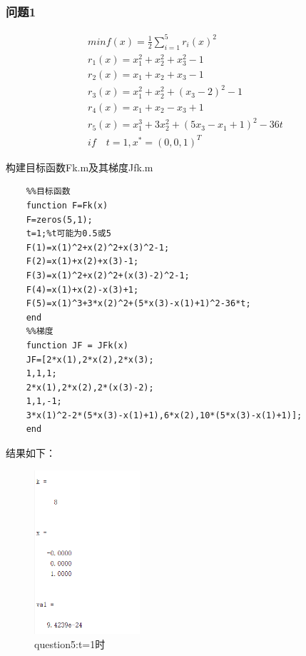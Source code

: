\documentclass[12pt]{article} %
\begin{document}
	\subsubsection{问题1}
	\begin{gather*}
	minf(x)=\frac{1}{2}\sum_{i=1}^{5} r_i(x)^2\\
	r_1(x)=x_1^2+x_2^2+x_3^2-1\\
	r_2(x)=x_1+x_2+x_3-1\\
	r_3(x)=x_1^2+x_2^2+(x_3-2)^2-1\\
	r_4(x)=x_1+x_2-x_3+1\\
	r_5(x)=x_1^3+3x_2^2+(5x_3-x_1+1)^2-36t\\
	if\quad t=1,x^*=(0,0,1)^T
	\end{gather*}
	
	构建目标函数Fk.m及其梯度Jfk.m
	\begin{lstlisting}
	%%目标函数
	function F=Fk(x)
	F=zeros(5,1);
	t=1;%t可能为0.5或5
	F(1)=x(1)^2+x(2)^2+x(3)^2-1;
	F(2)=x(1)+x(2)+x(3)-1;
	F(3)=x(1)^2+x(2)^2+(x(3)-2)^2-1;
	F(4)=x(1)+x(2)-x(3)+1;
	F(5)=x(1)^3+3*x(2)^2+(5*x(3)-x(1)+1)^2-36*t;
	end
	%%梯度
	function JF = JFk(x)
	JF=[2*x(1),2*x(2),2*x(3);
	1,1,1;
	2*x(1),2*x(2),2*(x(3)-2);
	1,1,-1;
	3*x(1)^2-2*(5*x(3)-x(1)+1),6*x(2),10*(5*x(3)-x(1)+1)];
	end
	\end{lstlisting}
	
	结果如下：
	\begin{figure}[ht]
		\centering
		\includegraphics[width=0.35\textwidth]{gmm1.png}
		\caption{question5:t=1时}
		\label{fig:fig1}
	\end{figure}
	
\end{document}

